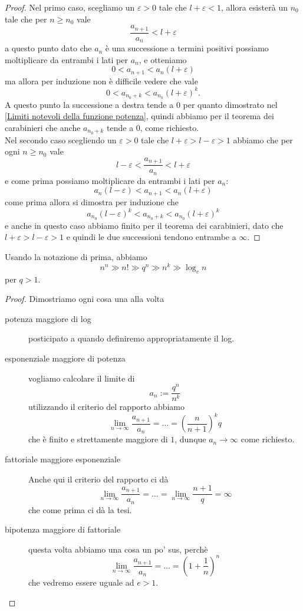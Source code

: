 \documentclass[11pt]{scrartcl}
\begin{document}
	\begin{proof}
		Nel primo caso, scegliamo un $\varepsilon>0$ tale che $l+\varepsilon<1$, allora esisterà un $n_0$ tale che per $n\ge n_0$ vale
		$$\frac{a_{n+1}}{a_n}<l+\varepsilon$$
		a questo punto dato che $a_n$ è una successione a termini positivi possiamo moltiplicare da entrambi i lati per $a_n$, e otteniamo
		$$0<a_{n+1}<a_n(l+\varepsilon)$$
		ma allora per induzione non è difficile vedere che vale
		$$0<a_{n_0+k}<a_{n_0}(l+\varepsilon)^k.$$
		A questo punto la successione a destra tende a $0$ per quanto dimostrato nel \ref{Limiti notevoli della funzione potenza}, quindi abbiamo per il teorema dei carabinieri che anche $a_{n_0+k}$ tende a $0$, come richiesto. \\
		Nel secondo caso scegliendo un $\varepsilon>0$ tale che $l+\varepsilon>l-\varepsilon>1$ abbiamo che per ogni $n\ge n_0$ vale
		$$l-\varepsilon<\frac{a_{n+1}}{a_n}<l+\varepsilon$$
		e come prima possiamo moltiplicare da entrambi i lati per $a_n$:
		$$a_n(l-\varepsilon)<a_{n+1}<a_n(l+\varepsilon)$$
		come prima allora si dimostra per induzione che 
		$$a_{n_0}(l-\varepsilon)^k<a_{n_0+k}<a_{n_0}(l+\varepsilon)^k$$
		e anche in questo caso abbiamo finito per il teorema dei carabinieri, dato che $l+\varepsilon>l-\varepsilon>1$ e quindi le due successioni tendono entrambe a $\infty$.
	\end{proof}
	\begin{lemma}
		Usando la notazione di prima, abbiamo
		$$n^n\gg n! \gg q^n \gg n^k \gg \log_e{n}$$
		per $q>1$.
	\end{lemma}
	\begin{proof}
		Dimostriamo ogni cosa una alla volta
		\begin{description}
			\item[potenza maggiore di log] posticipato a quando definiremo appropriatamente il log.
			\item[esponenziale maggiore di potenza] vogliamo calcolare il limite di 
			$$a_n:=\frac{q^n}{n^k}$$
			utilizzando il criterio del rapporto abbiamo
			$$\lim_{n\to \infty}\frac{a_{n+1}}{a_n}=\dots =\left(\frac{n}{n+1}\right)^k q$$
			che è finito e strettamente maggiore di $1$, dunque $a_n\to \infty$ come richiesto.
			\item[fattoriale maggiore esponenziale] Anche qui il criterio del rapporto ci dà
			$$\lim_{n\to\infty}\frac{a_{n+1}}{a_n}=\dots=\lim_{n\to\infty}\frac{n+1}{q}=\infty$$
			che come prima ci dà la tesi.
			\item[bipotenza maggiore di fattoriale] questa volta abbiamo una cosa un po' sus, perchè
			$$\lim_{n\to \infty}\frac{a_{n+1}}{a_n}=\dots=\left(1+\frac{1}{n}\right)^n$$
			che vedremo essere uguale ad $e>1$.
		\end{description}
	\end{proof}
\end{document}
